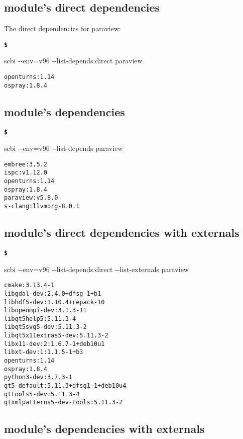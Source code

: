 \documentclass[a4paper,12pt,twoside]{article}
\newenvironment{shellcommand}{
	\begin{list}{ %
			\bfseries\texttt \$
		}{ %
			\ttfamily
			\setlength{\topsep}{-0.3ex}
			\setlength{\labelwidth}{1in}
			\setlength{\leftmargin}{0.7in}
			\setlength{\labelsep}{0.5ex}
			\setlength{\rightmargin}{0.5in}
			\setlength{\itemsep}{1ex}
			\setlength{\parsep}{0ex}
			\setlength{\listparindent}{0.5in}
		}
	}{
	\end{list}
}
\newcommand{\ddash}{-{}-}
\begin{document}
\subsection{module's direct dependencies}

The direct dependencies for paraview:

\begin{shellcommand}
	\item scbi \ddash{}env=v96 \ddash{}list-depends:direct paraview
\end{shellcommand}

\begin{lstlisting}
openturns:1.14
ospray:1.8.4
\end{lstlisting}

\subsection{module's dependencies}

\begin{shellcommand}
	\item scbi \ddash{}env=v96 \ddash{}list-depends paraview
\end{shellcommand}

\begin{lstlisting}
embree:3.5.2
ispc:v1.12.0
openturns:1.14
ospray:1.8.4
paraview:v5.8.0
s-clang:llvmorg-8.0.1
\end{lstlisting}

\subsection{module's direct dependencies with externals}

\begin{shellcommand}
	\item scbi \ddash{}env=v96 \ddash{}list-depends:direct \ddash{}list-externals paraview
\end{shellcommand}

\begin{lstlisting}
cmake:3.13.4-1
libgdal-dev:2.4.0+dfsg-1+b1
libhdf5-dev:1.10.4+repack-10
libopenmpi-dev:3.1.3-11
libqt5help5:5.11.3-4
libqt5svg5-dev:5.11.3-2
libqt5x11extras5-dev:5.11.3-2
libx11-dev:2:1.6.7-1+deb10u1
libxt-dev:1:1.1.5-1+b3
openturns:1.14
ospray:1.8.4
python3-dev:3.7.3-1
qt5-default:5.11.3+dfsg1-1+deb10u4
qttools5-dev:5.11.3-4
qtxmlpatterns5-dev-tools:5.11.3-2
\end{lstlisting}

\subsection{module's dependencies with externals}
\end{document}
